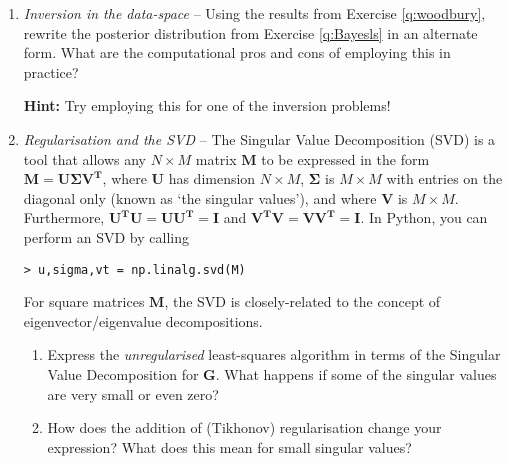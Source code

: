 \documentclass[a4paper,11pt]{article}
\newenvironment{hint}{
	\begin{mdframed}[backgroundcolor=gray!10,roundcorner=5pt]\textbf{Hint:} }{
	\end{mdframed}}
\begin{document}
\begin{enumerate}[resume]
\item \textit{Inversion in the data-space} -- Using the results from Exercise \ref{q:woodbury}, rewrite the posterior distribution from Exercise \ref{q:Bayesls} in an alternate form. What are the computational pros and cons of employing this in practice? 
\begin{hint}
Try employing this for one of the inversion problems!
\end{hint}
\item \textit{Regularisation and the SVD}\label{q:svd} --
The Singular Value Decomposition (SVD) is a tool that allows any $N\times M$ matrix $\mathbf{M}$ to be expressed in the form $\mathbf{M}=\mathbf{U\Sigma V^T}$, where $\mathbf{U}$ has dimension $N\times M$, $\boldsymbol{\Sigma}$ is $M\times M$ with entries on the diagonal only (known as `the singular values'), and where $\mathbf{V}$ is $M\times M$. Furthermore, $\mathbf{U^TU=UU^T}=\mathbf{I}$ and $\mathbf{V^TV=VV^T=I}$. In Python, you can perform an SVD by calling
\begin{verbatim}
> u,sigma,vt = np.linalg.svd(M)
\end{verbatim}
For square matrices $\mathbf{M}$, the SVD is closely-related to the concept of eigenvector/eigenvalue decompositions.
%
%

\begin{enumerate}
\item Express the \emph{unregularised} least-squares algorithm in terms of the Singular Value Decomposition for $\mathbf{G}$. What happens if some of the singular values are very small or even zero?
\item How does the addition of (Tikhonov) regularisation change your expression? What does this mean for small singular values? 
\end{enumerate}


\end{enumerate}
\end{document}
